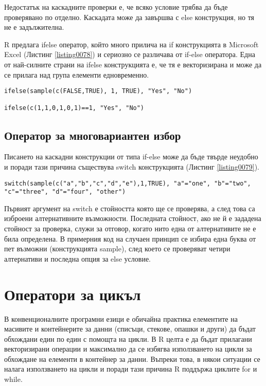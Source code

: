 Недостатък на каскадните проверки е, че всяко условие трябва да бъде проверявано по отделно. Каскадата може да завършва с else конструкция, но тя не е задължителна.

R предлага ifelse оператор, който много прилича на if конструкцията в Microsoft Excel (Листинг \ref{listing0078}) и сериозно се различава от if-else оператора. Една от най-силните страни на ifelse конструкцията е, че тя е векторизирана и може да се прилага над група елементи едновременно.

\begin{lstlisting}[caption=Функцията ifelse, label=listing0078]
ifelse(sample(c(FALSE,TRUE), 1, TRUE), "Yes", "No")

ifelse(c(1,1,0,1,0,1)==1, "Yes", "No")
\end{lstlisting}

\subsection{Оператор за многовариантен избор}

Писането на каскадни конструкции от типа if-else може да бъде твърде неудобно и поради тази причина съществува switch конструкцията (Листинг \ref{listing0079}).

\begin{lstlisting}[caption=Конструкция за многовариантен избор switch, label=listing0079]
switch(sample(c("a","b","c","d","e"),1,TRUE), "a"="one", "b"="two", "c"="three", "d"="four", "other")
\end{lstlisting}

Първият аргумент на switch е стойността която ще се проверява, а след това са изброени алтернативните възможности. Последната стойност, ако не й е зададена стойност за проверка, служи за отговор, когато нито една от алтернативите не е била определена. В примерния код на случаен принцип се избира една буква от пет възможни (конструкцията sample), след което се проверяват четири алтернативи и последна опция за else условие.

\section{Оператори за цикъл}

В конвенционалните програмни езици е обичайна практика елементите на масивите и контейнерите за данни (списъци, стекове, опашки и други) да бъдат обхождани един по един с помощта на цикли. В R целта е да бъдат прилагани векторизирани операции и максимално да се избягва използването на цикли за обхождане на елементи в контейнер за данни. Въпреки това, в някои ситуации се налага използването на цикли и поради тази причина R поддържа циклите for и while.

